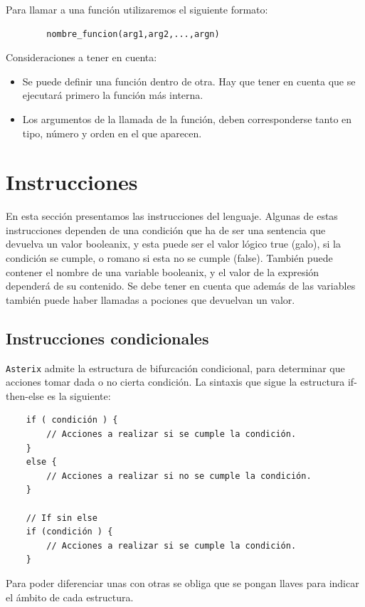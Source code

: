 \documentclass[a4paper, 10pt]{article}
\newcommand{\atx}{\texttt{Asterix} }
\begin{document}
    Para llamar a una función utilizaremos el siguiente formato:
    \begin{verbatim}
        nombre_funcion(arg1,arg2,...,argn)
    \end{verbatim}
    
    Consideraciones a tener en cuenta:
    \begin{itemize}
        \item Se puede definir una función dentro de otra. Hay que tener en
            cuenta que se ejecutará primero la función más interna.
        \item Los argumentos de la llamada de la función, deben corresponderse
            tanto en tipo, número y orden en el que aparecen.
    \end{itemize}

    \section*{Instrucciones}
    En esta sección presentamos las instrucciones del lenguaje. Algunas de estas
    instrucciones dependen de una condición que ha de ser una sentencia que
    devuelva un valor booleanix, y esta puede ser el valor lógico true (galo),
    si la condición se cumple, o romano si esta no se cumple (false). También
    puede contener el nombre de una variable booleanix, y el valor de la
    expresión dependerá de su contenido. Se debe tener en cuenta que además de
    las variables también puede haber llamadas a pociones que devuelvan un
    valor.

    \subsection*{Instrucciones condicionales}
    \atx admite la estructura de bifurcación condicional, para determinar que
    acciones tomar dada o no cierta condición. La sintaxis que sigue la
    estructura if-then-else es la siguiente:
    
    \begin{verbatim}
    if ( condición ) { 
        // Acciones a realizar si se cumple la condición.
    }
    else {
        // Acciones a realizar si no se cumple la condición.
    }

    // If sin else
    if (condición ) {
        // Acciones a realizar si se cumple la condición.
    }
    \end{verbatim}
    
    Para poder diferenciar unas con otras se obliga que se pongan llaves para
    indicar el ámbito de cada estructura.
\end{document}
